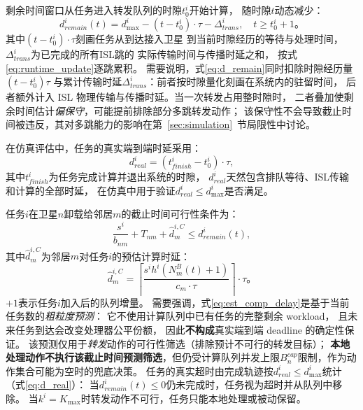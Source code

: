 \documentclass[a4paper,11pt]{article}
\begin{document}
剩余时间窗口从任务进入转发队列的时隙$t^i_0$开始计算，
随时隙$t$动态减少：
\begin{equation}
    d^i_{remain}(t) = d^i_{\max}
    - (t - t^i_0)\cdot\tau
    - \Delta^i_{trans},
    \quad t \geq t^i_0 + 1。
    \label{eq:d_remain}
\end{equation}
其中$(t - t^i_0)\cdot\tau$刻画任务从到达接入卫星
到当前时隙经历的等待与处理时间，
$\Delta^i_{trans}$为已完成的所有ISL跳的
实际传输时间与传播时延之和，
按式\eqref{eq:runtime_update}逐跳累积。
需要说明，式\eqref{eq:d_remain}同时扣除时隙经历量$(t - t^i_0)\tau$
与累计传输时延$\Delta^i_{trans}$：前者按时隙量化刻画在系统内的驻留时间，
后者额外计入 ISL 物理传输与传播时延。当一次转发占用整时隙时，
二者叠加使剩余时间估计\emph{偏保守}，可能提前排除部分多跳转发动作；
该保守性不会导致截止时间被违反，其对多跳能力的影响在第~\ref{sec:simulation}~节局限性中讨论。

在仿真评估中，任务的真实端到端时延采用：
\begin{equation}
    d^i_{real} = (t^i_{finish} - t^i_0)\cdot\tau,
    \label{eq:d_real}
\end{equation}
其中$t^i_{finish}$为任务完成计算并退出系统的时隙，
$d^i_{real}$天然包含排队等待、ISL传输和计算的全部时延，
在仿真中用于验证$d^i_{real} \leq d^i_{\max}$是否满足。

任务$i$在卫星$n$卸载给邻居$m$的截止时间可行性条件为：
\begin{equation}
    \frac{s^i}{b_{nm}} + T_{nm}
    + \hat{d}^{i,C}_m \leq d^i_{remain}(t),
    \label{eq:deadline}
\end{equation}
其中$\hat{d}^{i,C}_m$为邻居$m$对任务$i$的预估计算时延：
\begin{equation}
    \hat{d}^{i,C}_m = \left\lceil
    \frac{s^i h^i (N^B_m(t) + 1)}{c_m \cdot \tau}
    \right\rceil \cdot \tau。
    \label{eq:est_comp_delay}
\end{equation}
$+1$表示任务$i$加入后的队列增量。
需要强调，式\eqref{eq:est_comp_delay}是基于当前任务数的\emph{粗粒度预测}：
它不使用计算队列中已有任务的完整剩余 workload，
且未来任务到达会改变处理器公平份额，
因此\textbf{不构成}真实端到端 deadline 的确定性保证。
该预测仅用于\emph{转发}动作的可行性筛选（排除预计不可行的转发目标）；
\textbf{本地处理动作不执行该截止时间预测筛选}，但仍受计算队列并发上限$B^{cap}_n$限制，作为动作集合可能为空时的兜底决策。
任务的真实超时由完成轨迹按$d^i_{real} \le d^i_{\max}$统计（式\eqref{eq:d_real}）：
当$d^i_{remain}(t) \leq 0$仍未完成时，任务视为超时并从队列中移除。
当$k^i = K_{\max}$时转发动作不可行，任务只能本地处理或被动保留。
\end{document}
